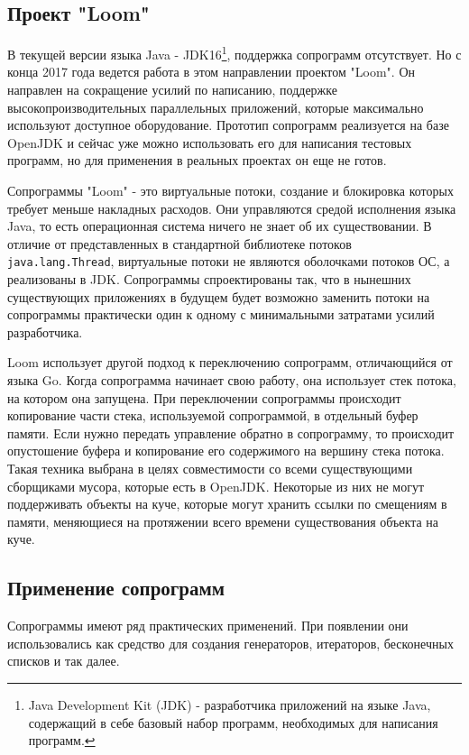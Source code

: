 	\subsection{Проект "Loom"}
	В текущей версии языка Java - JDK16\footnote{Java Development Kit (JDK) - разработчика приложений на языке Java,
	содержащий в себе базовый набор программ, необходимых для написания программ.}, поддержка 
	сопрограмм отсутствует. Но с конца 2017 года ведется 
	работа в этом направлении проектом "Loom". Он направлен на сокращение усилий по написанию, поддержке
	высокопроизводительных параллельных приложений, которые максимально используют доступное
	оборудование\cite{loom-main}. Прототип сопрограмм реализуется на базе OpenJDK и сейчас уже можно использовать
	его для написания тестовых программ, но  для применения в реальных проектах он еще не готов.
	\par
	Сопрограммы "Loom" - это виртуальные потоки, создание и блокировка которых требует меньше накладных расходов\cite{loom-main}. Они управляются средой исполнения языка Java, то есть операционная
	система ничего не знает об их существовании. В отличие от представленных в стандартной библиотеке потоков
	\texttt{java.lang.Thread}, виртуальные потоки не являются оболочками потоков ОС, а реализованы в JDK.
	Сопрограммы спроектированы так, что в нынешних существующих приложениях в будущем будет
	возможно заменить потоки на сопрограммы практически один к одному с минимальными затратами усилий 
	разработчика.
	
	\par
	Loom использует другой подход к переключению сопрограмм, отличающийся от языка Go. Когда сопрограмма начинает
	свою работу, она использует стек потока, на котором она запущена. При переключении сопрограммы происходит
	копирование части стека, используемой сопрограммой, в отдельный буфер памяти. Если нужно передать 
	управление обратно в сопрограмму, то происходит опустошение буфера и копирование его содержимого на 
	вершину стека потока\cite{loom-main}. Такая техника выбрана в целях совместимости со всеми существующими 
	сборщиками мусора, которые есть в OpenJDK. Некоторые из них не могут поддерживать объекты на куче, которые
	могут хранить ссылки по смещениям в памяти, меняющиеся на протяжении всего времени существования объекта на куче.
	\clearpage
	
	\subsection{Применение сопрограмм}
	Сопрограммы имеют ряд практических применений. При появлении они использовались как средство
	для создания генераторов, итераторов, бесконечных списков и так далее. 
	

